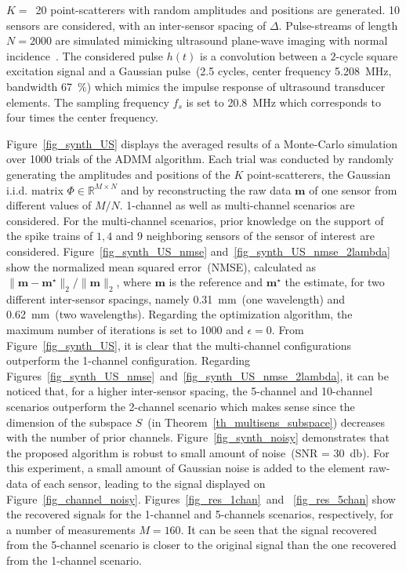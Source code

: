 \documentclass{article}
\newcommand{\vect}[1]{\bm{#1}}
\newcommand{\mat}[1]{\mathsf{#1}}
\theoremstyle{definition}
\begin{document}
$K=$~\num{20} point-scatterers with random amplitudes and positions are generated. 
\num{10} sensors are considered, with an inter-sensor spacing of $\Delta$. Pulse-streams of length $N = 2000$ are simulated mimicking ultrasound plane-wave imaging with normal incidence~\cite{montaldo_uffc_2014}.
The considered pulse $h\left(t\right)$ is a convolution between a $2$-cycle square excitation signal and a Gaussian pulse~(\num{2.5} cycles, center frequency \SI{5.208}{\mega\hertz}, bandwidth \SI{67}{\percent}) which mimics the impulse response of ultrasound transducer elements. The sampling frequency $f_s$ is set to \SI{20.8}{\mega\hertz} which corresponds to four times the center frequency.

Figure~\ref{fig_synth_US} displays the averaged results of a Monte-Carlo simulation over \num{1000} trials of the ADMM algorithm. 
Each trial was conducted by randomly generating the amplitudes and positions of the $K$ point-scatterers, the Gaussian i.i.d. matrix $\mat{\Phi} \in \mathbb{R}^{M \times N}$ and by reconstructing the raw data $\vect{m}$ of one sensor from different values of $M/N$. 1-channel as well as multi-channel scenarios are considered. 
For the multi-channel scenarios, prior knowledge on the support of the spike trains of $1, 4$ and $9$ neighboring sensors of the sensor of interest are considered. 
Figure~\ref{fig_synth_US_nmse} and~\ref{fig_synth_US_nmse_2lambda} show the normalized mean squared error~(NMSE), calculated as $\| \vect{m} - \vect{m}^\star \|_2 / \| \vect{m}\|_2$, where $\vect{m}$ is the reference and $\vect{m}^\star$ the estimate, for two different inter-sensor spacings, namely \SI{0.31}{\milli\metre}~(one wavelength) and \SI{0.62}{\milli\metre}~(two wavelengths). 
Regarding the optimization algorithm, the maximum number of iterations is set to \num{1000} and $\epsilon = 0$. 
From Figure~\ref{fig_synth_US}, it is clear that the multi-channel configurations outperform the 1-channel configuration. 
Regarding Figures~\ref{fig_synth_US_nmse}~and~\ref{fig_synth_US_nmse_2lambda}, it can be noticed that, for a higher inter-sensor spacing, the \num{5}-channel and \num{10}-channel scenarios outperform the \num{2}-channel scenario which makes sense since the dimension of the subspace $S$~(in Theorem~\ref{th_multisens_subspace}) decreases with the number of prior channels.
Figure~\ref{fig_synth_noisy} demonstrates that the proposed algorithm is robust to small amount of noise~(SNR = \SI{30}{\decibel}). 
For this experiment, a small amount of Gaussian noise is added to the element raw-data of each sensor, leading to the signal displayed on Figure~\ref{fig_channel_noisy}. Figures~\ref{fig_res_1chan}~and ~\ref{fig_res_5chan} show the recovered signals for the \num{1}-channel and \num{5}-channels scenarios, respectively, for a number of measurements $M=160$. 
It can be seen that the signal recovered from the \num{5}-channel scenario is closer to the original signal than the one recovered from the \num{1}-channel scenario.
\end{document}
